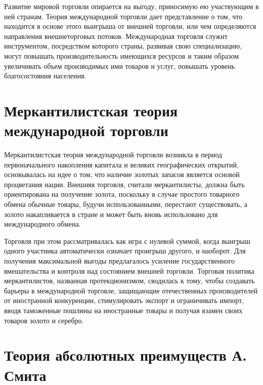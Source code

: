 Развитие мировой торговли опирается на выгоду, приносимую ею участвующим в ней
странам. Теория международной торговли дает представление о том, что находится
в основе этого выигрыша от внешней торговли, или чем определяются направления
внешнеторговых потоков. Международная торговля служит инструментом, посредством
которого страны, развивая свою специализацию, могут повышать производительность
имеющихся ресурсов и таким образом увеличивать объем производимых ими товаров и
услуг, повышать уровень благосостояния населения.

\vspace*{2em} %

\section{Меркантилистская теория международной торговли}

Меркантилистская теория международной торговли возникла в период
первоначального накопления капитала и великих географических открытий,
основывалась на идее о том, что наличие золотых запасов является основой
процветания нации. Внешняя торговля, считали меркантилисты, должна быть
ориентирована на получение золота, поскольку в случае простого товарного обмена
обычные товары, будучи использованными, перестают существовать, а золото
накапливается в стране и может быть вновь использовано для международного
обмена.

Торговля при этом рассматривалась как игра с нулевой суммой, когда выигрыш
одного участника автоматически означает проигрыш другого, и наоборот. Для
получения максимальной выгоды предлагалось усиление государственного
вмешательства и контроля над состоянием внешней торговли. Торговая политика
меркантилистов, названная протекционизмом, сводилась к тому, чтобы создавать
барьеры в международной торговле, защищающие отечественных производителей от
иностранной конкуренции, стимулировать экспорт и ограничивать импорт, вводя
таможенные пошлины на иностранные товары и получая взамен своих товаров золото
и серебро.

\vspace*{2em} %

\section{Теория  абсолютных преимуществ А. Смита}

